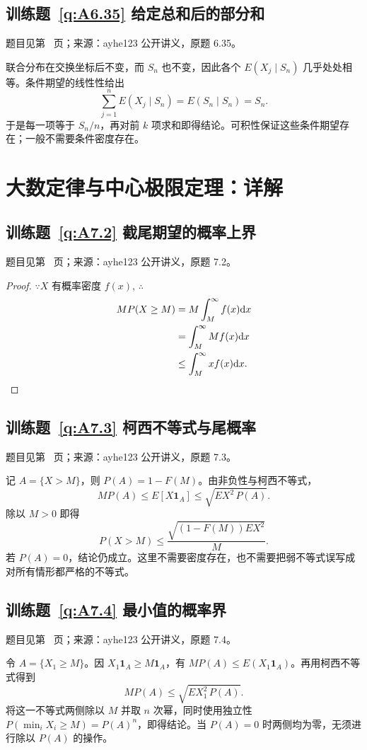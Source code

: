 \subsection*{训练题~\ref{q:A6.35} 给定总和后的部分和}\label{a:A6.35}{\small 题目见第~\pageref{q:A6.35} 页；来源：ayhe123 公开讲义，原题 6.35。}
\begin{solve}联合分布在交换坐标后不变，而 $S_n$ 也不变，因此各个 $E(X_j\mid S_n)$ 几乎处处相等。条件期望的线性性给出\[\sum_{j=1}^nE(X_j\mid S_n)=E(S_n\mid S_n)=S_n.\]于是每一项等于 $S_n/n$，再对前 $k$ 项求和即得结论。可积性保证这些条件期望存在；一般不需要条件密度存在。\end{solve}

\clearpage\section*{大数定律与中心极限定理：详解}

\subsection*{训练题~\ref{q:A7.2} 截尾期望的概率上界}\label{a:A7.2}{\small 题目见第~\pageref{q:A7.2} 页；来源：ayhe123 公开讲义，原题 7.2。}
\begin{proof}
    $\because X$ 有概率密度 $f(x)$, $\therefore$
    \begin{align*}
        MP(X\geq M) & =M\int_M^\infty f(x)\mathrm{d}x \\
        & =\int_M^\infty Mf(x)\mathrm{d}x \\
        & \leq\int_M^\infty xf(x)\mathrm{d}x.\qedhere
    \end{align*}
\end{proof}

\subsection*{训练题~\ref{q:A7.3} 柯西不等式与尾概率}\label{a:A7.3}{\small 题目见第~\pageref{q:A7.3} 页；来源：ayhe123 公开讲义，原题 7.3。}
\begin{solve}记 $A=\{X>M\}$，则 $P(A)=1-F(M)$。由非负性与柯西不等式，\[MP(A)\le E[X\mathbf1_A]\le\sqrt{EX^2\,P(A)}.\]除以 $M>0$ 即得\[P(X>M)\le\frac{\sqrt{(1-F(M))EX^2}}M.\]若 $P(A)=0$，结论仍成立。这里不需要密度存在，也不需要把弱不等式误写成对所有情形都严格的不等式。\end{solve}

\subsection*{训练题~\ref{q:A7.4} 最小值的概率界}\label{a:A7.4}{\small 题目见第~\pageref{q:A7.4} 页；来源：ayhe123 公开讲义，原题 7.4。}
\begin{solve}令 $A=\{X_1\ge M\}$。因 $X_1\mathbf1_A\ge M\mathbf1_A$，有 $MP(A)\le E(X_1\mathbf1_A)$。再用柯西不等式得到\[MP(A)\le\sqrt{EX_1^2\,P(A)}.\]将这一不等式两侧除以 $M$ 并取 $n$ 次幂，同时使用独立性 $P(\min_iX_i\ge M)=P(A)^n$，即得结论。当 $P(A)=0$ 时两侧均为零，无须进行除以 $P(A)$ 的操作。\end{solve}


